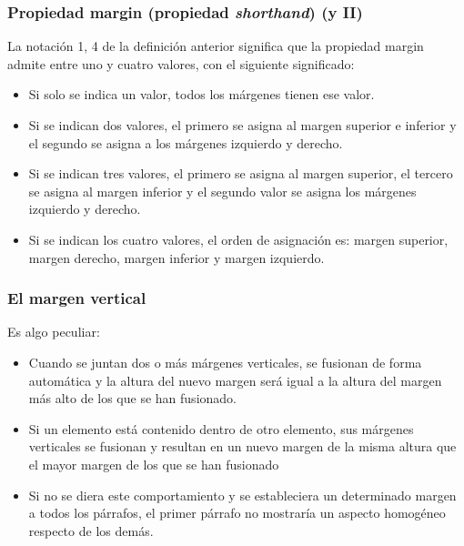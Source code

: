 \begin{frame}
\frametitle{Propiedad margin (propiedad \emph{shorthand}) (y II)}

La notación {1, 4} de la definición anterior significa que la propiedad margin admite entre uno y cuatro valores, con el siguiente significado:

\begin{itemize}
  \item Si solo se indica un valor, todos los márgenes tienen ese valor.
  \item Si se indican dos valores, el primero se asigna al margen superior e inferior y el segundo se asigna a los márgenes izquierdo y derecho.
  \item Si se indican tres valores, el primero se asigna al margen superior, el tercero se asigna al margen inferior y el segundo valor se asigna los márgenes izquierdo y derecho.
  \item Si se indican los cuatro valores, el orden de asignación es: margen superior, margen derecho, margen inferior y margen izquierdo.
\end{itemize}

\end{frame}


\begin{frame}
\frametitle{El margen vertical}

Es algo peculiar:

\begin{itemize}
  \item Cuando se juntan dos o más márgenes verticales, se fusionan de forma automática y la altura del nuevo margen será igual a la altura del margen más alto de los que se han fusionado.
  \item Si un elemento está contenido dentro de otro elemento, sus márgenes verticales se fusionan y resultan en un nuevo margen de la misma altura que el mayor margen de los que se han fusionado
  \item Si no se diera este comportamiento y se estableciera un determinado margen a todos los párrafos, el primer párrafo no mostraría un aspecto homogéneo respecto de los demás.
\end{itemize}

\end{frame}


